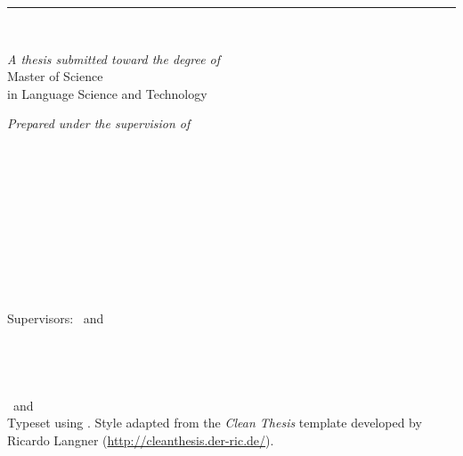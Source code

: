%
\begin{titlepage}
	\tgherosfont
	\flushright
	\hfill
	\vfill
	
	{\color{ctcolorsection}%
	{\LARGE\textbf{\thesisTitle}} \par
	{\Large \thesisSubtitle} \par
	} %
	
	\rule[5pt]{\textwidth}{.4pt} \par
	
	{\LARGE \authorName} \\[2mm]

	\vfill
	
	
	\textit{A thesis submitted toward the degree of} \\[1mm]
	{\Large Master of Science} \\[1mm]
	{\large in Language Science and Technology} \\	
	
	\vfill	
	
	\textit{Prepared under the supervision of} \\
	\thesisFirstSupervisor \\
	\thesisSecondSupervisor 
	
	\vfill
	
	
	{\Large \thesisUniversity} \\[2mm]
	{\large \thesisUniversityDepartment} \\
	
	\vfill
	
	\thesisDate \\
	
\end{titlepage}


\hfill
\vfill
\small
{\tgherosfont \textbf{\authorName}} \\
\texttt{\authorContact}\\
\textit{\thesisTitle} \\
\thesisDate \\
Supervisors: \thesisFirstSupervisor\ and \thesisSecondSupervisor \\

{\tgherosfont \textbf{\thesisUniversity}} \\
\thesisUniversityDepartment \\
\thesisUniversityInstitute \\
\thesisUniversityStreetAddress \\
\thesisUniversityPostalCode\ and \thesisUniversityCity \\[1.5em]

Typeset using \LaTeXe.
Style adapted from the \textit{Clean Thesis} template developed by Ricardo Langner (\url{http://cleanthesis.der-ric.de/}).
